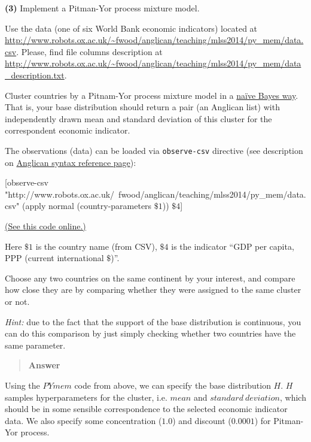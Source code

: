 \documentclass[11pt,reqno]{amsart}
\newif\ifanswers
\newcommand{\+}[1]{\ensuremath{{\mathbf{#1}}}}
\begin{document}
\vspace{1cm}
{\bf (3)} Implement a Pitman-Yor process mixture model.


Use the data (one of six World Bank economic indicators) located at \url{http://www.robots.ox.ac.uk/~fwood/anglican/teaching/mlss2014/py_mem/data.csv}. Please, find file columns description at \url{http://www.robots.ox.ac.uk/~fwood/anglican/teaching/mlss2014/py_mem/data_description.txt}.

Cluster countries by a Pitnam-Yor process mixture model in a \href{http://en.wikipedia.org/wiki/Naive_Bayes_classifier}{na\"{i}ve Bayes way}. That is, your base distribution should return a pair (an Anglican list) with independently drawn mean and standard deviation of this cluster for the correspondent economic indicator.

The observations (data) can be loaded via \texttt{observe-csv} directive (see description on \href{http://www.robots.ox.ac.uk/~fwood/anglican/language/index.html}{Anglican syntax reference page}):

\begin{code}{}{}
[observe-csv
  "http://www.robots.ox.ac.uk/~fwood/anglican/teaching/mlss2014/py_mem/data.csv"
  (apply normal (country-parameters $\$1$)) $\$4$]
\end{code}
\href{http://www.robots.ox.ac.uk/~fwood/anglican/teaching/mlss2014/py_mem/code/3_1.anglican}{(See this code online.)}

Here $\$1$ is the country name (from CSV), $\$4$ is the indicator ``GDP per capita, PPP (current international $\$$)''.

Choose any two countries on the same continent by your interest, and compare
how close they are by comparing whether they were assigned to the same cluster or not.

{\it Hint:} due to the fact that the support of the base distribution is continuous, you can do this comparison
by just simply checking whether two countries have the same parameter.

\ifanswers
\begin{quotation}
 {\bf Answer } 
\end{quotation}

Using the $PYmem$ code from above, we can specify the base distribution $H$. $H$ samples hyperparameters for the cluster, i.e. $mean$ and $standard\ deviation$, which should be in some sensible correspondence to the selected economic indicator data.
We also specify some concentration ($1.0$) and discount ($0.0001$) for Pitman-Yor process.
\end{document}
